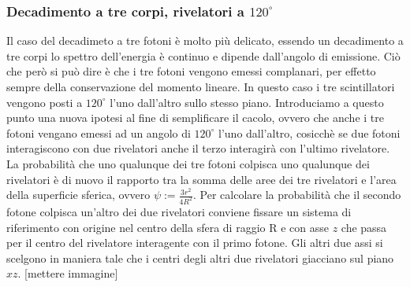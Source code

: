   \subsubsection{Decadimento a tre corpi, rivelatori a \(120^\circ\)}
  Il caso del decadimeto a tre fotoni è molto più delicato, essendo un decadimento a tre corpi lo spettro dell'energia è continuo e dipende dall'angolo di emissione. Ciò che però
  si può dire è che i tre fotoni vengono emessi complanari, per effetto sempre della conservazione del momento lineare. In questo caso i tre scintillatori vengono posti a \(120^\circ\)
  l'uno dall'altro sullo stesso piano. Introduciamo a questo punto una nuova ipotesi al fine di semplificare il cacolo, ovvero che anche i tre fotoni vengano emessi ad un angolo di
  \(120^\circ\) l'uno dall'altro, cosicchè se due fotoni interagiscono con due rivelatori anche il terzo interagirà con l'ultimo rivelatore. La probabilità che uno qualunque dei tre
  fotoni colpisca uno qualunque dei rivelatori è di nuovo il rapporto tra la somma delle aree dei tre rivelatori e l'area della superficie sferica, ovvero \(\psi := \frac{3r^2}{4R^2} \).
  Per calcolare la probabilità che il secondo fotone colpisca un'altro dei due rivelatori conviene fissare un sistema di riferimento con origine nel centro della sfera di raggio R
  e con asse \(z\) che passa per il centro del rivelatore interagente con il primo fotone. Gli altri due assi si scelgono in maniera tale che i centri degli altri due rivelatori
  giacciano sul piano \(xz\). [mettere immagine]\\

